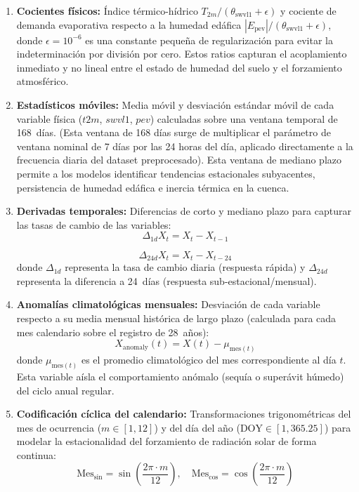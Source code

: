 \documentclass[12pt, a4paper]{article}
\begin{document}
\begin{enumerate}
    \item \textbf{Cocientes físicos:} Índice térmico-hídrico $T_{2m} / (\theta_{\text{swvl1}} + \epsilon)$ y cociente de demanda evaporativa respecto a la humedad edáfica $|E_{\text{pev}}| / (\theta_{\text{swvl1}} + \epsilon)$, donde $\epsilon = 10^{-6}$ es una constante pequeña de regularización para evitar la indeterminación por división por cero. Estos ratios capturan el acoplamiento inmediato y no lineal entre el estado de humedad del suelo y el forzamiento atmosférico.
    \item \textbf{Estadísticos móviles:} Media móvil y desviación estándar móvil de cada variable física ($t2m$, $swvl1$, $pev$) calculadas sobre una ventana temporal de 168~días. (Esta ventana de 168 días surge de multiplicar el parámetro de ventana nominal de 7 días por las 24 horas del día, aplicado directamente a la frecuencia diaria del dataset preprocesado). Esta ventana de mediano plazo permite a los modelos identificar tendencias estacionales subyacentes, persistencia de humedad edáfica e inercia térmica en la cuenca.
    \item \textbf{Derivadas temporales:} Diferencias de corto y mediano plazo para capturar las tasas de cambio de las variables:
    \begin{equation}
        \Delta_{1d} X_t = X_t - X_{t-1}
    \end{equation}

    \begin{equation}
        \Delta_{24d} X_t = X_t - X_{t-24}
    \end{equation}
    donde $\Delta_{1d}$ representa la tasa de cambio diaria (respuesta rápida) y $\Delta_{24d}$ representa la diferencia a 24~días (respuesta sub-estacional/mensual).
    \item \textbf{Anomalías climatológicas mensuales:} Desviación de cada variable respecto a su media mensual histórica de largo plazo (calculada para cada mes calendario sobre el registro de 28~años):
    \begin{equation}
        X_{\text{anomaly}}(t) = X(t) - \mu_{\text{mes}(t)}
    \end{equation}
    donde $\mu_{\text{mes}(t)}$ es el promedio climatológico del mes correspondiente al día $t$. Esta variable aísla el comportamiento anómalo (sequía o superávit húmedo) del ciclo anual regular.
    \item \textbf{Codificación cíclica del calendario:} Transformaciones trigonométricas del mes de ocurrencia ($m \in [1, 12]$) y del día del año ($\text{DOY} \in [1, 365.25]$) para modelar la estacionalidad del forzamiento de radiación solar de forma continua:
    \begin{equation}
        \text{Mes}_{\text{sin}} = \sin\left(\frac{2\pi \cdot m}{12}\right), \quad \text{Mes}_{\text{cos}} = \cos\left(\frac{2\pi \cdot m}{12}\right)
    \end{equation}


\end{enumerate}
\end{document}
